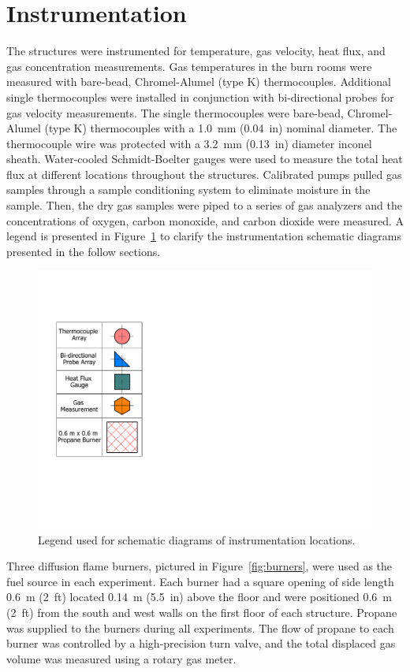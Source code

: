 \clearpage
\section{Instrumentation}
\label{sec:intrumentation}
The structures were instrumented for temperature, gas velocity, heat flux, and gas concentration measurements. Gas temperatures in the burn rooms were measured with bare-bead, Chromel-Alumel (type K) thermocouples. Additional single thermocouples were installed in conjunction with bi-directional probes for gas velocity measurements. The single thermocouples were bare-bead, Chromel-Alumel (type K) thermocouples with a 1.0~mm (0.04~in) nominal diameter. The thermocouple wire was protected with a 3.2~mm (0.13~in) diameter inconel sheath. Water-cooled Schmidt-Boelter gauges were used to measure the total heat flux at different locations throughout the structures. Calibrated pumps pulled gas samples through a sample conditioning system to eliminate moisture in the sample. Then, the dry gas samples were piped to a series of gas analyzers and the concentrations of oxygen, carbon monoxide, and carbon dioxide were measured. A legend is presented in Figure~\ref{fig:Instrumentation_Legend} to clarify the instrumentation schematic diagrams presented in the follow sections.

\begin{figure}[!h]
	\centering
	\includegraphics[width=0.25\columnwidth]{Figures/Floor_Plans/Instrumentation_Legend}
	\caption[Instrumentation legend]{Legend used for schematic diagrams of instrumentation locations.}
	\label{fig:Instrumentation_Legend}
\end{figure}

Three diffusion flame burners, pictured in Figure~\ref{fig:burners}, were used as the fuel source in each experiment. Each burner had a square opening of side length 0.6~m (2~ft) located 0.14~m (5.5~in) above the floor and were positioned 0.6~m (2~ft) from the south and west walls on the first floor of each structure. Propane was supplied to the burners during all experiments. The flow of propane to each burner was controlled by a high-precision turn valve, and the total displaced gas volume was measured using a rotary gas meter.


